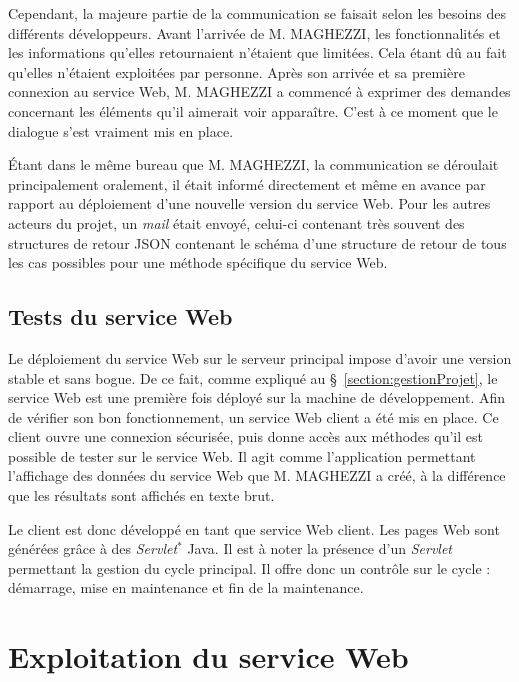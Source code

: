 Cependant, la majeure partie de la communication se faisait selon les besoins des diff\'erents d\'eveloppeurs.
Avant l'arriv\'ee de M. MAGHEZZI, les fonctionnalit\'es et les informations qu'elles retournaient n'\'etaient que limit\'ees.
Cela \'etant d\^u au fait qu'elles n'\'etaient exploit\'ees par personne.
Apr\`es son arriv\'ee et sa premi\`ere connexion au service Web, M. MAGHEZZI a commenc\'e \`a exprimer des demandes concernant les \'el\'ements qu'il aimerait voir appara\^itre.
C'est \`a ce moment que le dialogue s'est vraiment mis en place.

\'Etant dans le m\^eme bureau que M. MAGHEZZI, la communication se d\'eroulait principalement oralement, il \'etait inform\'e directement et m\^eme en avance par rapport au d\'eploiement d'une nouvelle version du service Web.
Pour les autres acteurs du projet, un \textit{mail} \'etait envoy\'e, celui-ci contenant tr\`es souvent des structures de retour JSON contenant le sch\'ema d'une structure de retour de tous les cas possibles pour une m\'ethode sp\'ecifique du service Web.

\subsection{Tests du service Web}

Le d\'eploiement du service Web sur le serveur principal impose d'avoir une version stable et sans bogue.
De ce fait, comme expliqu\'e au \S~\ref{section:gestionProjet}, le service Web est une premi\`ere fois d\'eploy\'e sur la machine de d\'eveloppement.
Afin de v\'erifier son bon fonctionnement, un service Web client a \'et\'e mis en place.
Ce client ouvre une connexion s\'ecuris\'ee, puis donne acc\`es aux m\'ethodes qu'il est possible de tester sur le service Web.
Il agit comme l'application permettant l'affichage des donn\'ees du service Web que M. MAGHEZZI a cr\'e\'e, \`a la diff\'erence que les r\'esultats sont affich\'es en texte brut.

Le client est donc d\'evelopp\'e en tant que service Web client.
Les pages Web sont g\'en\'er\'ees gr\^ace \`a des \textit{Servlet}$^*$ Java.
Il est \`a noter la pr\'esence d'un \textit{Servlet} permettant la gestion du cycle principal.
Il offre donc un contr\^ole sur le cycle : d\'emarrage, mise en maintenance et fin de la maintenance.


\section{Exploitation du service Web}

